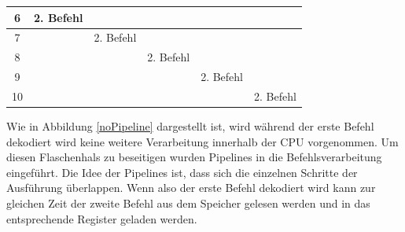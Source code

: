 \documentclass[12pt]{article}
\begin{document}
\begin{table}[!htb]
\begin{tabular}{|c|l|l|l|l|l|}
6    & 2. Befehl                                                                        &                                 &                                                                                 &                                &                                                                                            \\ \hline
7    &                                                                                  & 2. Befehl                       &                                                                                 &                                &                                                                                            \\ \hline
8    &                                                                                  &                                 & 2. Befehl                                                                       &                                &                                                                                            \\ \hline
9    &                                                                                  &                                 &                                                                                 & 2. Befehl                      &                                                                                            \\ \hline
10   &                                                                                  &                                 &                                                                                 &                                & 2. Befehl                                                                                  \\ \hline


\end{tabular}
\end{table}

\par\bigskip\noindent Wie in Abbildung \ref{noPipeline} dargestellt ist, wird während der erste Befehl dekodiert wird keine weitere Verarbeitung innerhalb der CPU vorgenommen. Um diesen Flaschenhals zu beseitigen wurden Pipelines in die Befehlsverarbeitung eingeführt. Die Idee der Pipelines ist, dass sich die einzelnen Schritte der Ausführung überlappen. Wenn also der erste Befehl dekodiert wird kann zur gleichen Zeit der zweite Befehl aus dem Speicher gelesen werden und in das entsprechende Register geladen werden.
\end{document}

